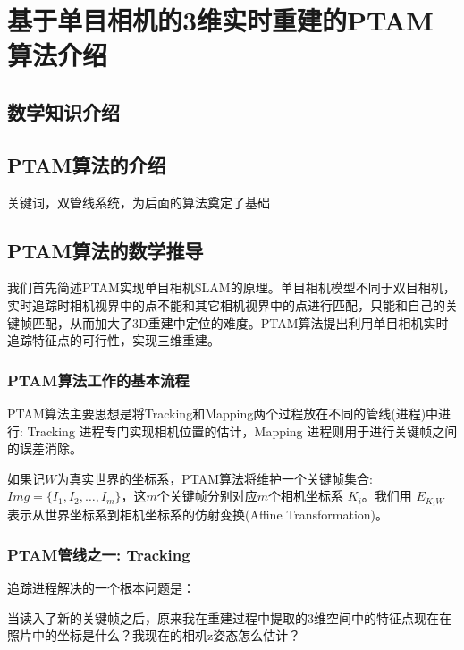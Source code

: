 
\def \R2{\mathbb{R}^2}
\def \R3{\mathbb{R}^3}
\def \Rn{\mathbb{R}^n}

\def \itW{\mathit{W}}

\def \itK{\mathit{K}}
\def \bfp{\mathbf{p}}

\chapter{基于单目相机的3维实时重建的PTAM算法介绍}

\section{数学知识介绍}

\section{PTAM算法的介绍}
关键词，双管线系统，为后面的算法奠定了基础

\section{PTAM算法的数学推导}
我们首先简述PTAM实现单目相机SLAM的原理。单目相机模型不同于双目相机，实时追踪时相机视界中的点不能和其它相机视界中的点进行匹配，只能和自己的关键帧匹配，从而加大了3D重建中定位的难度。PTAM算法提出利用单目相机实时追踪特征点的可行性，实现三维重建。

\subsection{PTAM算法工作的基本流程}
PTAM算法主要思想是将Tracking和Mapping两个过程放在不同的管线(进程)中进行: Tracking 进程专门实现相机位置的估计，Mapping 进程则用于进行关键帧之间的误差消除。

如果记$\itW$为真实世界的坐标系，PTAM算法将维护一个关键帧集合: $Img=\{I_1,I_2,\ldots,I_m\}$，这\(m\)个关键帧分别对应\(m\)个相机坐标系 $\itK_i$。我们用 $E_{\itK_i\itW}$ 表示从世界坐标系到相机坐标系的仿射变换(Affine Transformation)。

\subsection{PTAM管线之一: Tracking}

%
%
追踪进程解决的一个根本问题是：

当读入了新的关键帧之后，原来我在重建过程中提取的3维空间中的特征点现在在照片中的坐标是什么？我现在的相机z姿态怎么估计？ 

